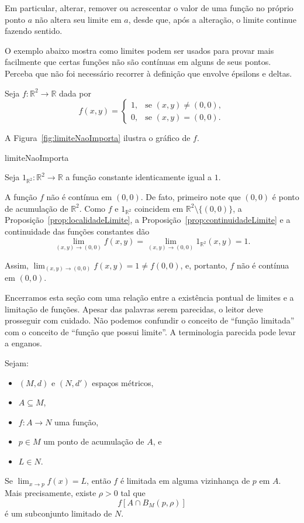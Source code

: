 Em particular, alterar, remover ou acrescentar o valor de uma função no próprio ponto $a$ não altera seu limite em $a$, desde que, após a alteração, o limite continue fazendo sentido.

O exemplo abaixo mostra como limites podem ser usados para provar mais facilmente que certas funções não são contínuas em alguns de seus pontos.
Perceba que não foi necessário recorrer à definição que envolve épsilons e deltas.

\begin{example}\label{ex:limiteNaoImporta}
    Seja $f:\mathbb R^2\rightarrow \mathbb R$ dada por
    \[
        f(x, y) = \begin{cases}
            1, & \text{se } (x, y) \neq (0, 0),\\
            0, & \text{se } (x, y) = (0, 0).
        \end{cases}
    \]

    A Figura~\ref{fig:limiteNaoImporta} ilustra o gráfico de $f$.

    {limiteNaoImporta}

    Seja $1_{\mathbb R^2}:\mathbb R^2\to\mathbb R$ a função constante identicamente igual a $1$.

    A função $f$ não é contínua em $(0, 0)$.
    De fato, primeiro note que $(0, 0)$ é ponto de acumulação de $\mathbb R^2$.
    Como $f$ e $1_{\mathbb R^2}$ coincidem em $\mathbb R^2\setminus\{(0,0)\}$, a Proposição~\ref{prop:localidadeLimite}, a Proposição~\ref{prop:continuidadeLimite} e a continuidade das funções constantes dão
    \[
        \lim_{(x, y)\to (0, 0)} f(x, y)
        =
        \lim_{(x, y)\to (0, 0)} 1_{\mathbb R^2}(x, y)
        =
        1.
    \]

    Assim, $\lim_{(x, y)\to (0, 0)} f(x, y) = 1 \neq f(0, 0)$, e, portanto, $f$ não é contínua em $(0, 0)$.
\end{example}

Encerramos esta seção com uma relação entre a existência pontual de limites e a limitação de funções.
Apesar das palavras serem parecidas, o leitor deve prosseguir com cuidado.
Não podemos confundir o conceito de ``função limitada'' com o conceito de ``função que possui limite''.
A terminologia parecida pode levar a enganos.

\begin{lemma}\label{lem:limiteImplicaLimitacaoLocal}
    Sejam:
    \begin{itemize}
        \item $(M,d)$ e $(N,d')$ espaços métricos,
        \item $A\subseteq M$,
        \item $f:A\to N$ uma função,
        \item $p\in M$ um ponto de acumulação de $A$, e
        \item $L\in N$.
    \end{itemize}

    Se $\lim_{x\to p}f(x)=L$, então $f$ é limitada em alguma vizinhança de $p$ em $A$.
    Mais precisamente, existe $\rho>0$ tal que
    \[
        f[A\cap B_M(p,\rho)]
    \]
    é um subconjunto limitado de $N$.
\end{lemma}

